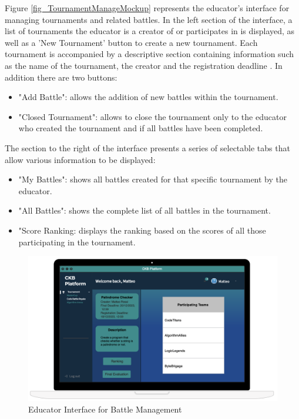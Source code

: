 Figure \ref{fig_TournamentManageMockup} represents the educator's interface for managing tournaments and related battles.
\newline
In the left section of the interface, a list of tournaments the educator is a creator of or participates in is displayed, as well as a 'New Tournament' button to create a new tournament.
\newline
Each tournament is accompanied by a descriptive section containing information such as the name of the tournament, the creator and the registration deadline .
In addition there are two buttons: 
\begin{itemize}
    \setlength{\itemsep}{0pt}
    \setlength{\parskip}{0pt}
    \setlength{\parsep}{0pt}
    \setlength{\partopsep}{0pt}
    \setlength{\topsep}{0pt}
    \item "Add Battle": allows the addition of new battles within the tournament.
    \item "Closed Tournament": allows to close the tournament only to the educator who created the tournament and if all battles have been completed.
\end{itemize}

The section to the right of the interface presents a series of selectable tabs that allow various information to be displayed:
\begin{itemize}
    \setlength{\itemsep}{0pt}
    \setlength{\parskip}{0pt}
    \setlength{\parsep}{0pt}
    \setlength{\partopsep}{0pt}
    \setlength{\topsep}{0pt}
    \item "My Battles": shows all battles created for that specific tournament by the educator.
    \item "All Battles": shows the complete list of all battles in the tournament.
    \item "Score Ranking: displays the ranking based on the scores of all those participating in the tournament.
\end{itemize}


\vspace{0.5\baselineskip}
\begin{figure}[h]
    \centering
    \includegraphics[scale=0.35]{images/Mockup/ListTeamsMockup.png} 
    \caption{Educator Interface for Battle Management}
    \label{fig_ListTeamsMockup}
\end{figure}

